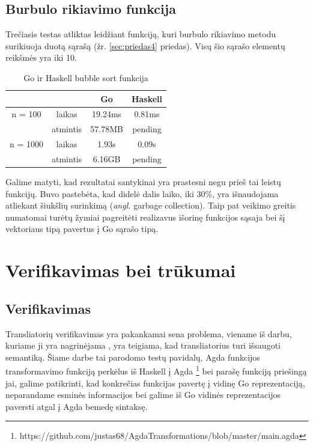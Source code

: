 \documentclass{VUMIFPSkursinis}
\begin{document}
\subsection{Burbulo rikiavimo funkcija}
Trečiasis testas atliktas leidžiant funkciją, kuri burbulo rikiavimo metodu surikiuoja duotą sąrašą (žr. \ref{sec:priedas4} priedas). Visų šio sąrašo elementų reikšmės yra iki 10.
			\begin{center}
				\centering
				\begin{table}[h]
					\caption{Go ir Haskell bubble sort funkcija}
					\centering
				\begin{tabular}{ cccc } 
				& & \textbf{Go} & \textbf{Haskell}  \\
				\midrule
				n = 100 & laikas & 19.24ms & 0.81ms    \\
				 & atmintis & 57.78MB & pending  \\
				\midrule
				n = 1000 & laikas & 1.93s & 0.09s  \\
				 & atmintis & 6.16GB & pending \\
				\midrule
				\end{tabular}
				\centering
			\end{table}
				\end{center}
Galime matyti, kad rezultatai santykinai yra prastesni negu prieš tai leistų funkcijų. Buvo pastebėta, kad didelė dalis laiko, iki 30\%, yra išnaudojama atliekant šiukšlių surinkimą (\textit{angl.} garbage collection). Taip pat veikimo greitis numatomai turėtų žymiai pagreitėti realizavus išorinę funkcijos sąsaja bei šį vektoriaus tipą pavertus į Go sąrašo tipą.
\section{Verifikavimas bei trūkumai}
\subsection{Verifikavimas}
Transliatorių verifikavimas yra pakankamai sena problema, viename iš darbu, kuriame ji yra nagrinėjama \cite{compilerCorrectness}, yra teigiama, kad transliatorius turi išsaugoti semantiką. Šiame darbe tai parodomo testų pavidalų, Agda funkcijos transformavimo funkciją perkėlus iš Haskell į Agda \footnote{https://github.com/justas68/AgdaTransformations/blob/master/main.agda} bei parašę funkciją priešingą jai, galime patikrinti, kad konkrečias funkcijas pavertę į vidinę Go reprezentaciją, neparandame esminės informacijos bei galime iš Go vidinės reprezentacijos paversti atgal į Agda bemedę sintaksę.
\end{document}
